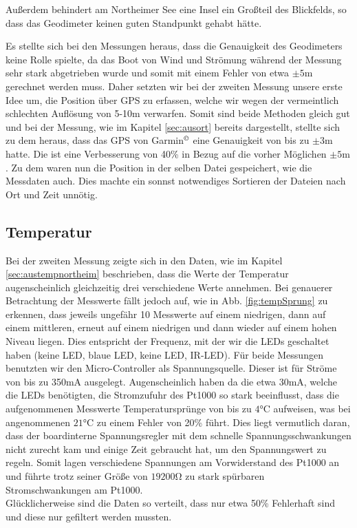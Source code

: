 \documentclass[12pt,a4paper,titlepage,headinclude,bibtotoc]{scrartcl}
\numberwithin{equation}{subsection}
\begin{document}
Außerdem behindert am Northeimer See eine Insel ein Großteil des Blickfelds, so dass das Geodimeter keinen guten Standpunkt gehabt hätte.

Es stellte sich bei den Messungen heraus, dass die Genauigkeit des Geodimeters keine Rolle spielte, da das Boot von Wind und Strömung während der Messung sehr stark abgetrieben wurde und somit mit einem Fehler von etwa $\pm5\si{\meter}$ gerechnet werden muss.
Daher setzten wir bei der zweiten Messung unsere erste Idee um, die Position über GPS zu erfassen, welche wir wegen der vermeintlich schlechten Auflösung von 5-10m verwarfen.
Somit sind beide Methoden gleich gut und bei der Messung, wie im Kapitel \ref{sec:ausort} bereits dargestellt, stellte sich zu dem heraus, dass das GPS von Garmin$^\copyright$ eine Genauigkeit von bis zu $\pm3\si{\meter}$ hatte.
Die ist eine Verbesserung von 40\% in Bezug auf die vorher Möglichen $\pm5\si{\meter}$.
Zu dem waren nun die Position in der selben Datei gespeichert, wie die Messdaten auch.
Dies machte ein sonnst notwendiges Sortieren der Dateien nach Ort und Zeit unnötig.

\subsection{Temperatur}
\label{sec:DiskTemp}
Bei der zweiten Messung zeigte sich in den Daten, wie im Kapitel \ref{sec:austempnortheim} beschrieben, dass die Werte der Temperatur augenscheinlich gleichzeitig drei verschiedene Werte annehmen.
Bei genauerer Betrachtung der Messwerte fällt jedoch auf, wie in Abb. \ref{fig:tempSprung} zu erkennen, dass jeweils ungefähr 10 Messwerte auf einem niedrigen, dann auf einem mittleren, erneut auf einem niedrigen und dann wieder auf einem hohen Niveau liegen.
Dies entspricht der Frequenz, mit der wir die LEDs geschaltet haben (keine LED, blaue LED, keine LED, IR-LED).
Für beide Messungen benutzten wir den Micro-Controller als Spannungsquelle.
Dieser ist für Ströme von bis zu 350mA ausgelegt.
Augenscheinlich haben da die etwa 30\si{\milli\ampere}, welche die LEDs benötigten, die Stromzufuhr des Pt1000 so stark beeinflusst, dass die aufgenommenen Messwerte Temperatursprünge von bis zu $4\si{\celsius}$ aufweisen, was bei angenommenen $21\si{\celsius}$ zu einem Fehler von 20\% führt.
Dies liegt vermutlich daran, dass der boardinterne Spannungsregler mit dem schnelle Spannungsschwankungen nicht zurecht kam und einige Zeit gebraucht hat, um den Spannungswert zu regeln.
Somit lagen verschiedene Spannungen am Vorwiderstand des Pt1000 an und führte trotz seiner Größe von $19200\si{\ohm}$ zu stark spürbaren Stromschwankungen am Pt1000.\\
Glücklicherweise sind die Daten so verteilt, dass nur etwa 50\% Fehlerhaft sind und diese nur gefiltert werden mussten.
\end{document}
